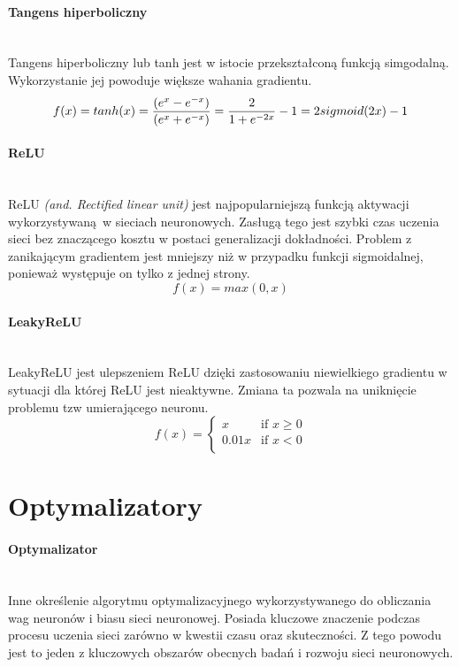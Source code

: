 \paragraph{Tangens hiperboliczny} \mbox{}\\
Tangens hiperboliczny lub tanh jest w istocie przekształconą funkcją simgodalną. Wykorzystanie
jej powoduje większe wahania gradientu.
\begin{equation}
f(x) = tanh(x) = \frac{(e^x - e^{-x})}{(e^x + e^{-x})} = \frac{2}{1+e^{-2x}} - 1 = 2 sigmoid(2x) - 1\\
\end{equation}

\paragraph{ReLU} \mbox{}\\
ReLU \textit{(and. Rectified linear unit)} jest najpopularniejszą funkcją aktywacji
wykorzystywaną w sieciach neuronowych. Zasługą tego jest szybki czas uczenia sieci
bez znaczącego kosztu w postaci generalizacji dokładności. Problem z zanikającym
gradientem jest mniejszy niż w przypadku funkcji sigmoidalnej, ponieważ występuje
on tylko z jednej strony.
\begin{equation}
f(x) = max(0, x)
\end{equation}

\paragraph{LeakyReLU} \mbox{}\\
LeakyReLU jest ulepszeniem ReLU dzięki zastosowaniu niewielkiego gradientu w sytuacji
dla której ReLU jest nieaktywne. Zmiana ta pozwala na uniknięcie problemu tzw
umierającego neuronu.
\begin{equation}
f(x) =
\begin{cases}
 x & \text{if } x \geqslant 0 \\
 0.01x & \text{if } x < 0 \\
\end{cases}
\end{equation}

\section{Optymalizatory}
\paragraph{Optymalizator} \mbox{}\\
Inne określenie algorytmu optymalizacyjnego wykorzystywanego do obliczania wag neuronów
i biasu sieci neuronowej. Posiada kluczowe znaczenie podczas procesu uczenia sieci
zarówno w kwestii czasu oraz skuteczności. Z tego powodu jest to jeden z kluczowych
obszarów obecnych badań i rozwoju sieci neuronowych.

